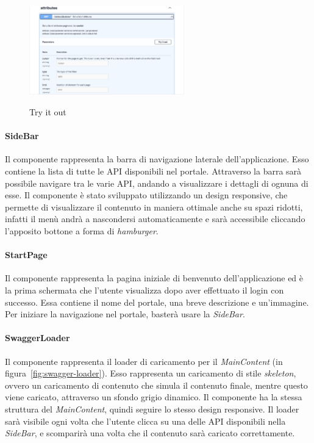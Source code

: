 \begin{figure}[ht]
  \centering
  \includegraphics[width=0.6\textwidth, alt={Sezione try it out di un endpoint}]{images/frontend/TryItOut.jpg}
  \caption{Try it out}\label{fig:try-it-out}
\end{figure}


\paragraph{SideBar}\label{par:side-bar}
Il componente rappresenta la barra di navigazione laterale dell'applicazione. Esso contiene la lista di tutte le API disponibili nel portale.
Attraverso la barra sarà possibile navigare tra le varie API, andando a visualizzare i dettagli di ognuna di esse. 
Il componente è stato sviluppato utilizzando un design responsive, che permette di visualizzare il contenuto in maniera ottimale anche su spazi ridotti, 
infatti il menù andrà a nascondersi automaticamente e sarà accessibile cliccando l'apposito bottone a forma di \textit{hamburger}.\\


\paragraph{StartPage}\label{par:start-page}
Il componente rappresenta la pagina iniziale di benvenuto dell'applicazione ed è la prima schermata che l'utente visualizza dopo aver effettuato il login con successo.
Essa contiene il nome del portale, una breve descrizione e un'immagine. Per iniziare la navigazione nel portale, basterà usare la \textit{SideBar}.

\paragraph{SwaggerLoader}\label{par:swagger-loader}
Il componente rappresenta il loader di caricamento per il \textit{MainContent} (in figura~\ref{fig:swagger-loader}). 
Esso rappresenta un caricamento di stile \textit{skeleton}, ovvero un caricamento di contenuto che simula il contenuto finale, mentre questo viene caricato, attraverso un sfondo grigio dinamico.
Il componente ha la stessa struttura del \textit{MainContent}, quindi seguire lo stesso design responsive.
Il loader sarà visibile ogni volta che l'utente clicca su una delle API disponibili nella \textit{SideBar}, e scomparirà una volta che il contenuto sarà caricato correttamente.

